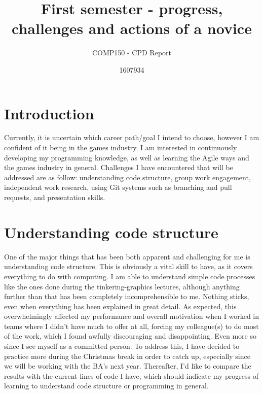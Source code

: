 \documentclass{scrartcl}
\title{First semester - progress, challenges and actions of a novice}
\subtitle{COMP150 - CPD Report}
\author{1607934}
\begin{document}
\maketitle

\section{Introduction}

Currently, it is uncertain which career path/goal I intend to choose, however I am confident of it being in the games industry. I am interested in continuously developing my programming knowledge, as well as learning the Agile ways and the games industry in general. Challenges I have encountered that will be addressed are as follow: understanding code structure, group work engagement, independent work research, using Git systems such as branching and pull requests, and presentation skills. 

\section{Understanding code structure}
One of the major things that has been both apparent and challenging for me is understanding code structure. This is obviously a vital skill to have, as it covers everything to do with computing. I am able to understand simple code processes like the ones done during the tinkering-graphics lectures, although anything further than that has been completely incomprehensible to me. Nothing sticks, even when everything has been explained in great detail. As expected, this overwhelmingly affected my performance and overall motivation when I worked in teams where I didn't have much to offer at all, forcing my colleague(s) to do most of the work, which I found awfully discouraging and disappointing. Even more so since I see myself as a committed person. To address this, I have decided to practice more during the Christmas break in order to catch up, especially since we will be working with the BA's next year. Thereafter, I'd like to compare the results with the current lines of code I have, which should indicate my progress of learning to understand code structure or programming in general.  
\end{document}
